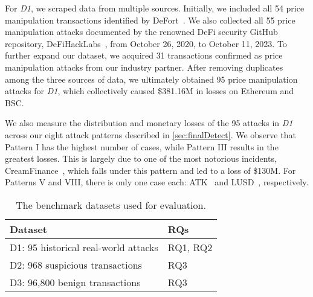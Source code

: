 For \textit{D1}, we scraped data from multiple sources.
Initially, we included all 54 price manipulation transactions identified by DeFort~\cite{DeFort24}.
We also collected all 55 price manipulation attacks documented by the renowned DeFi security GitHub repository, DeFiHackLabs~\cite{DeFiHackLabs}, from October 26, 2020, to October 11, 2023.
To further expand our dataset, we acquired 31 transactions confirmed as price manipulation attacks from our industry partner.
After removing duplicates among the three sources of data, we ultimately obtained 95 price manipulation attacks for \textit{D1}, which collectively caused \$381.16M in losses on Ethereum and BSC.

We also measure the distribution and monetary losses of the 95 attacks in \textit{D1} across our eight attack patterns described in \mysec\ref{sec:finalDetect}.
We observe that Pattern I has the highest number of cases, while Pattern III results in the greatest losses.
This is largely due to one of the most notorious incidents, CreamFinance~\cite{CreamFinance}, which falls under this pattern and led to a loss of \$130M.
For Patterns V and VIII, there is only one case each: ATK~\cite{ATK} and LUSD~\cite{LUSD}, respectively.

\begin{table}[t!]
    \centering
    \small
    \caption{The benchmark datasets used for evaluation.}
    \vspace{-2ex}
    \begin{tabular}{ll}
    \toprule
        Dataset & RQs \\
        \midrule
        D1: 95 historical real-world attacks & RQ1, RQ2\\
        \midrule
        D2: 968 suspicious transactions & RQ3\\
        \midrule
        D3: 96,800 benign transactions & RQ3\\
    \bottomrule
    \end{tabular}
    \label{tab:benchmark}
\end{table}

